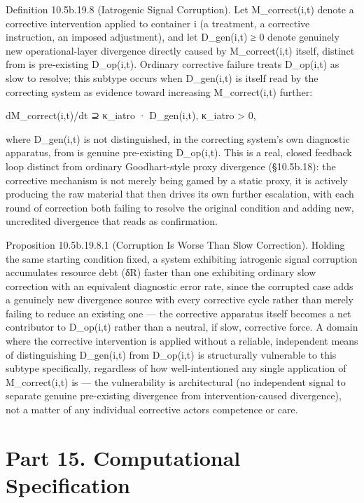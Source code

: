 \documentclass[
]{article}
\begin{document}
Definition 10.5b.19.8 (Iatrogenic Signal Corruption). Let
M\_correct(i,t) denote a corrective intervention applied to container i
(a treatment, a corrective instruction, an imposed adjustment), and let
D\_gen(i,t) ≥ 0 denote genuinely new operational-layer divergence
directly caused by M\_correct(i,t) itself, distinct from is pre-existing
D\_op(i,t). Ordinary corrective failure treats D\_op(i,t) as slow to
resolve; this subtype occurs when D\_gen(i,t) is itself read by the
correcting system as evidence toward increasing M\_correct(i,t) further:

dM\_correct(i,t)/dt ⊇ κ\_iatro · D\_gen(i,t), κ\_iatro \textgreater{} 0,

where D\_gen(i,t) is not distinguished, in the correcting system's own
diagnostic apparatus, from is genuine pre-existing D\_op(i,t). This is a
real, closed feedback loop distinct from ordinary Goodhart-style proxy
divergence (§10.5b.18): the corrective mechanism is not merely being
gamed by a static proxy, it is actively producing the raw material that
then drives its own further escalation, with each round of correction
both failing to resolve the original condition and adding new,
uncredited divergence that reads as confirmation.

Proposition 10.5b.19.8.1 (Corruption Is Worse Than Slow Correction).
Holding the same starting condition fixed, a system exhibiting
iatrogenic signal corruption accumulates resource debt (δR) faster than
one exhibiting ordinary slow correction with an equivalent diagnostic
error rate, since the corrupted case adds a genuinely new divergence
source with every corrective cycle rather than merely failing to reduce
an existing one --- the corrective apparatus itself becomes a net
contributor to D\_op(i,t) rather than a neutral, if slow, corrective
force. A domain where the corrective intervention is applied without a
reliable, independent means of distinguishing D\_gen(i,t) from
D\_op(i,t) is structurally vulnerable to this subtype specifically,
regardless of how well-intentioned any single application of
M\_correct(i,t) is --- the vulnerability is architectural (no
independent signal to separate genuine pre-existing divergence from
intervention-caused divergence), not a matter of any individual
corrective actors competence or care.

\hypertarget{part-15.-computational-specification}{%
\section{Part 15. Computational
Specification}\label{part-15.-computational-specification}}
\end{document}
